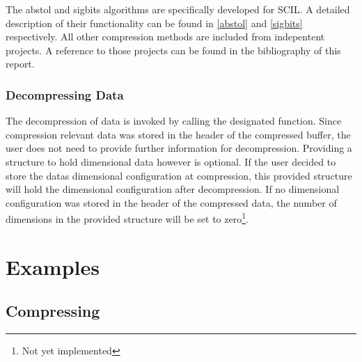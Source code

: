 \documentclass[
	12pt,
	a4paper,
	BCOR10mm,
	DIV14,
	headsepline,
]{scrreprt}
\begin{document}
\setcounter{footnote}{0}

\bigskip

The abstol and sigbits algorithms are specifically developed for SCIL. A
detailed description of their functionality can be found in \cref{abstol} and
\cref{sigbits} respectively. All other compression methods are included from
indepentent projects. A reference to those projects can be found in the
bibliography of this report.

\clearpage

\subsection{Decompressing Data}

\bigskip

The decompression of data is invoked by calling the designated function. Since
compression relevant data was stored in the header of the compressed buffer, the
user does not need to provide further information for decompression. Providing a
structure to hold dimensional data however is optional. If the user decided to
store the datas dimensional configuration at compression, this provided
structure will hold the dimensional configuration after decompression. If no
dimensional configuration was stored in the header of the compressed data, the
number of dimensions in the provided structure will be set to
zero\footnote{Not yet implemented}.

\setcounter{footnote}{0}

\chapter{Examples}


\section{Compressing}

\bigskip
\end{document}
